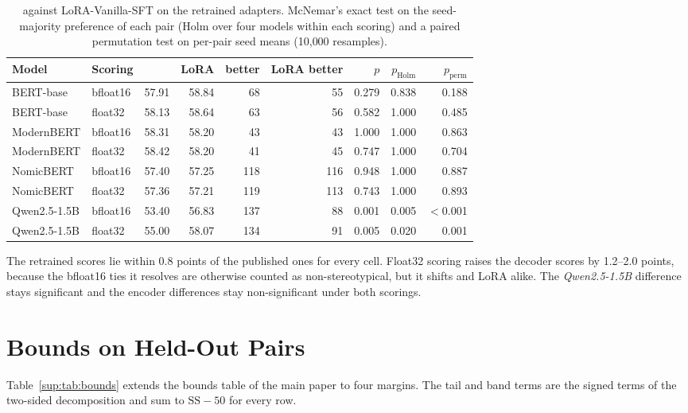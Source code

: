 \begin{table}[h]
  \centering
  \caption{\PEAT{} against LoRA-Vanilla-SFT on the retrained adapters. McNemar's exact test on the seed-majority preference of each pair (Holm over four models within each scoring) and a paired permutation test on per-pair seed means (10{,}000 resamples).}
  \label{sup:tab:fp32}
  \footnotesize\setlength{\tabcolsep}{4pt}
  \begin{tabular}{@{}llrrrrrrr@{}}
    \toprule
    Model & Scoring & \PEAT{} & LoRA & \PEAT{} better & LoRA better & $p$ & $p_{\mathrm{Holm}}$ & $p_{\mathrm{perm}}$ \\
    \midrule
    BERT-base & bfloat16 & 57.91 & 58.84 & 68 & 55 & 0.279 & 0.838 & 0.188 \\
    BERT-base & float32 & 58.13 & 58.64 & 63 & 56 & 0.582 & 1.000 & 0.485 \\
    ModernBERT & bfloat16 & 58.31 & 58.20 & 43 & 43 & 1.000 & 1.000 & 0.863 \\
    ModernBERT & float32 & 58.42 & 58.20 & 41 & 45 & 0.747 & 1.000 & 0.704 \\
    NomicBERT & bfloat16 & 57.40 & 57.25 & 118 & 116 & 0.948 & 1.000 & 0.887 \\
    NomicBERT & float32 & 57.36 & 57.21 & 119 & 113 & 0.743 & 1.000 & 0.893 \\
    Qwen2.5-1.5B & bfloat16 & 53.40 & 56.83 & 137 & 88 & 0.001 & 0.005 & $<$0.001 \\
    Qwen2.5-1.5B & float32 & 55.00 & 58.07 & 134 & 91 & 0.005 & 0.020 & 0.001 \\
    \bottomrule
  \end{tabular}
\end{table}

The retrained scores lie within 0.8 points of the published ones for every cell.
Float32 scoring raises the decoder scores by 1.2--2.0 points, because the bfloat16 ties it resolves are
otherwise counted as non-stereotypical, but it shifts \PEAT{} and LoRA alike.
The \textit{Qwen2.5-1.5B} difference stays significant and the encoder differences stay non-significant
under both scorings.

\section{Bounds on Held-Out Pairs}
\label{sup:bounds}

Table~\ref{sup:tab:bounds} extends the bounds table of the main paper to four margins.
The tail and band terms are the signed terms of the two-sided decomposition and sum to
$\mathrm{SS}-50$ for every row.

